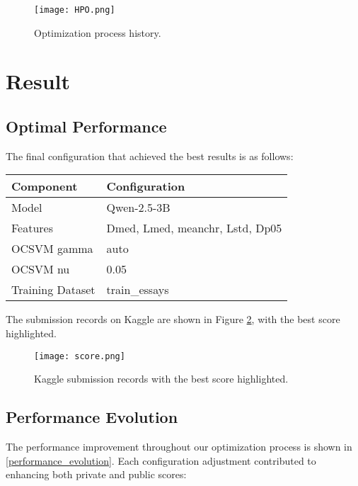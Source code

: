 \begin{figure}[t]
\vskip 0.1in
\begin{center}
\centerline{\texttt{[image: HPO.png]}}

\caption{Optimization process history.}

\label{hpo}
\end{center}
\vskip -0.2in
\end{figure}

\section{Result}
\label{Result}

\subsection{Optimal Performance}
The final configuration that achieved the best results is as follows:

\begin{table}[h]
\label{optimal_config}
\begin{center}
\begin{small}
\begin{tabular}{ll}
\toprule
\textbf{Component} & \textbf{Configuration} \\
\midrule
Model & Qwen-2.5-3B \\
Features & Dmed, Lmed, meanchr, Lstd, Dp05 \\
OCSVM gamma & auto \\
OCSVM nu & 0.05 \\
Training Dataset & train\_essays \\
\bottomrule
\end{tabular}
\end{small}
\end{center}
\vskip -0.1in
\end{table}

The submission records on Kaggle are shown in Figure \ref{fig:kaggle_submissions}, with the best score highlighted. 


\begin{figure}[h]
\centering
\texttt{[image: score.png]}
\caption{Kaggle submission records with the best score highlighted.}
\label{fig:kaggle_submissions}
\vskip -0.2in
\end{figure}

\subsection{Performance Evolution}
The performance improvement throughout our optimization process is shown in \cref{performance_evolution}. Each configuration adjustment contributed to enhancing both private and public scores:

